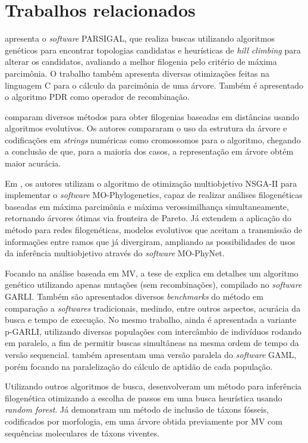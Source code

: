 \documentclass[12pt]{article}
\begin{document}
\section{Trabalhos relacionados}

\cite{parsigal} apresenta o \emph{software} PARSIGAL, que realiza buscas utilizando algoritmos genéticos para encontrar topologias candidatas e heurísticas de \emph{hill climbing} para alterar os candidatos, avaliando a melhor filogenia pelo critério de máxima parcimônia. O trabalho também apresenta diversas otimizações feitas na linguagem C para o cálculo da parcimônia de uma árvore.  Também é apresentado o algoritmo PDR como operador de recombinação.
  
\cite{cotta2002inferring} comparam diversos métodos para obter filogenias baseadas em distâncias usando algoritmos evolutivos. Os autores compararam o uso da estrutura da árvore e codificações em \emph{strings} numéricas como cromossomos para o algoritmo, chegando a conclusão de que, para a maioria dos casos, a representação em árvore obtém maior acurácia.

Em \cite{mo-phylogenetics}, os autores utilizam o algoritmo de otimização multiobjetivo NSGA-II para implementar o \emph{software} MO-Phylogenetics, capaz de realizar análises filogenéticas baseadas em máxima parcimônia e máxima verossimilhança simultaneamente, retornando árvores ótimas via fronteira de Pareto. Já \cite{mo-phynet} extendem a aplicação do método para redes filogenéticas, modelos evolutivos que aceitam a transmissão de informações entre ramos que já divergiram, ampliando as possibilidades de usos da inferência multiobjetivo através do \emph{software} MO-PhyNet.

Focando na análise baseada em MV, a tese de \cite{garli} explica em detalhes um algoritmo genético utilizando apenas mutações (sem recombinações), compilado no \emph{software} GARLI. Também são apresentados diversos \emph{benchmarks} do método em comparação a \emph{softwares} tradicionais, medindo, entre outros aspectos, acurácia da busca e tempo de execução. No mesmo trabalho, ainda é apresentada a variante p-GARLI, utilizando diversas populações com intercâmbio de indivíduos rodando em paralelo, a fim de permitir buscas simultâneas na mesma ordem de tempo da versão sequencial. \cite{parallel-gaml} também apresentam uma versão paralela do \emph{software} GAML, porém focando na paralelização do cálculo de aptidão de cada população. 

Utilizando outros algoritmos de busca, \cite{azouri2021harnessing} desenvolveram um método para inferência filogenética otimizando a escolha de passos em uma busca heurística usando \emph{random forest}. Já \cite{berger2010accuracy} demonstram um método de inclusão de táxons fósseis, codificados por morfologia, em uma árvore obtida previamente por MV com sequências moleculares de táxons viventes.
\end{document}
